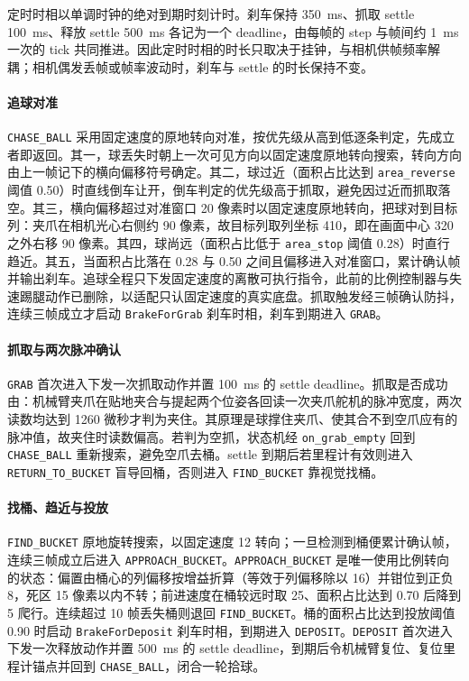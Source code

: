 定时时相以单调时钟的绝对到期时刻计时。刹车保持 350~ms、抓取 settle 100~ms、释放 settle 500~ms 各记为一个 deadline，由每帧的 step 与帧间约 1~ms 一次的 tick 共同推进。因此定时时相的时长只取决于挂钟，与相机供帧频率解耦；相机偶发丢帧或帧率波动时，刹车与 settle 的时长保持不变。

\paragraph{追球对准}
\texttt{CHASE\_BALL} 采用固定速度的原地转向对准，按优先级从高到低逐条判定，先成立者即返回。其一，球丢失时朝上一次可见方向以固定速度原地转向搜索，转向方向由上一帧记下的横向偏移符号确定。其二，球过近（面积占比达到 \texttt{area\_reverse} 阈值 0.50）时直线倒车让开，倒车判定的优先级高于抓取，避免因过近而抓取落空。其三，横向偏移超过对准窗口 20 像素时以固定速度原地转向，把球对到目标列：夹爪在相机光心右侧约 90 像素，故目标列取列坐标 410，即在画面中心 320 之外右移 90 像素。其四，球尚远（面积占比低于 \texttt{area\_stop} 阈值 0.28）时直行趋近。其五，当面积占比落在 0.28 与 0.50 之间且偏移进入对准窗口，累计确认帧并输出刹车。追球全程只下发固定速度的离散可执行指令，此前的比例控制器与失速踢腿动作已删除，以适配只认固定速度的真实底盘。抓取触发经三帧确认防抖，连续三帧成立才启动 \texttt{BrakeForGrab} 刹车时相，刹车到期进入 \texttt{GRAB}。

\paragraph{抓取与两次脉冲确认}
\texttt{GRAB} 首次进入下发一次抓取动作并置 100~ms 的 settle deadline。抓取是否成功由：机械臂夹爪在贴地夹合与提起两个位姿各回读一次夹爪舵机的脉冲宽度，两次读数均达到 1260 微秒才判为夹住。其原理是球撑住夹爪、使其合不到空爪应有的脉冲值，故夹住时读数偏高。若判为空抓，状态机经 \texttt{on\_grab\_empty} 回到 \texttt{CHASE\_BALL} 重新搜索，避免空爪去桶。settle 到期后若里程计有效则进入 \texttt{RETURN\_TO\_BUCKET} 盲导回桶，否则进入 \texttt{FIND\_BUCKET} 靠视觉找桶。

\paragraph{找桶、趋近与投放}
\texttt{FIND\_BUCKET} 原地旋转搜索，以固定速度 12 转向；一旦检测到桶便累计确认帧，连续三帧成立后进入 \texttt{APPROACH\_BUCKET}。\texttt{APPROACH\_BUCKET} 是唯一使用比例转向的状态：偏置由桶心的列偏移按增益折算（等效于列偏移除以 16）并钳位到正负 8，死区 15 像素以内不转；前进速度在桶较远时取 25、面积占比达到 0.70 后降到 5 爬行。连续超过 10 帧丢失桶则退回 \texttt{FIND\_BUCKET}。桶的面积占比达到投放阈值 0.90 时启动 \texttt{BrakeForDeposit} 刹车时相，到期进入 \texttt{DEPOSIT}。\texttt{DEPOSIT} 首次进入下发一次释放动作并置 500~ms 的 settle deadline，到期后令机械臂复位、复位里程计锚点并回到 \texttt{CHASE\_BALL}，闭合一轮拾球。

